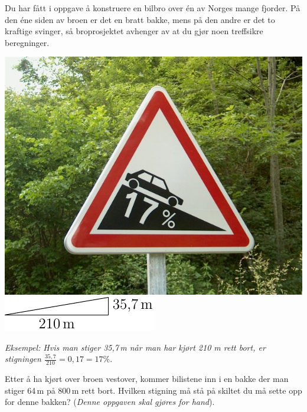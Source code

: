 Du har fått i oppgave å konstruere en bilbro over én av Norges mange fjorder. På den éne siden av broen er det en bratt bakke, mens på den andre er det to kraftige svinger, så broprosjektet avhenger av at du gjør noen treffsikre beregninger. \vsk

\qquad
\parbox[r][][l]{0.3\linewidth}{\includegraphics[scale=0.15]{stign}\\ \vspace{8pt}
\includegraphics[scale=0.8]{fig/bakke}
}\vspace{8pt}
\textsl{Eksempel: Hvis man stiger 35,7\,m når man har kjørt 210 m rett bort, er stigningen $ {\frac{35,7}{210}=0,17=17\%} $}.\os

Etter å ha kjørt over broen vestover, kommer bilistene inn i en bakke der man stiger 64\,m på 800\,m rett bort. Hvilken stigning må stå på skiltet du må sette opp for denne bakken? (\textsl{Denne oppgaven skal gjøres for hand}).\vsk

